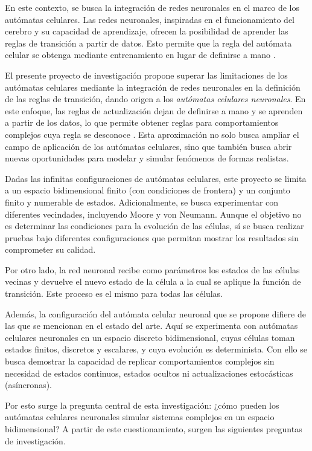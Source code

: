En este contexto, se busca la integración de redes neuronales en el marco de los autómatas celulares. Las redes neuronales, inspiradas en el funcionamiento del cerebro y su capacidad de aprendizaje, ofrecen la posibilidad de aprender las reglas de transición a partir de datos. Esto permite que la regla del autómata celular se obtenga mediante entrenamiento en lugar de definirse a mano \cite{RN}. 

El presente proyecto de investigación propone superar las limitaciones de los autómatas celulares mediante la integración de redes neuronales en la definición de las reglas de transición, dando origen a los \textit{autómatas celulares neuronales}. En este enfoque, las reglas de actualización dejan de definirse a mano y se aprenden a partir de los datos, lo que permite obtener reglas para comportamientos complejos cuya regla se desconoce \cite{matich2001_ann, mordvintsev2020_nca}. Esta aproximación no solo busca ampliar el campo de aplicación de los autómatas celulares, sino que también busca abrir nuevas oportunidades para modelar y simular fenómenos de formas realistas.  

Dadas las infinitas configuraciones de autómatas celulares, este proyecto se limita a un espacio bidimensional finito (con condiciones de frontera) y un conjunto finito y numerable de estados. Adicionalmente, se busca experimentar con diferentes vecindades, incluyendo Moore y von Neumann. Aunque el objetivo no es determinar las condiciones para la evolución de las células, sí se busca realizar pruebas bajo diferentes configuraciones que permitan mostrar los resultados sin comprometer su calidad.

Por otro lado, la red neuronal recibe como parámetros los estados de las células vecinas y devuelve el nuevo estado de la célula a la cual se aplique la función de transición. Este proceso es el mismo para todas las células.

Además, la configuración del autómata celular neuronal que se propone difiere de las que se mencionan en el estado del arte. Aquí se experimenta con autómatas celulares neuronales en un espacio discreto bidimensional, cuyas células toman estados finitos, discretos y escalares, y cuya evolución es determinista. Con ello se busca demostrar la capacidad de replicar comportamientos complejos sin necesidad de estados continuos, estados ocultos ni actualizaciones estocásticas (asíncronas).

Por esto surge la pregunta central de esta investigación: ¿cómo pueden los autómatas celulares neuronales simular sistemas complejos en un espacio bidimensional? A partir de este cuestionamiento, surgen las siguientes preguntas de investigación.

